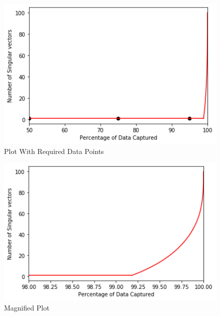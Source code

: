 \documentclass[a4 paper]{article}
\begin{document}
\begin{figure}[!htb]
    \centering
    \begin{minipage}{0.49\textwidth}
        \centering
        \includegraphics[width=1\textwidth]{Highly coorelated 1.png} \\
         Plot With Required Data Points
    \end{minipage}\hfill
    \begin{minipage}{0.49\textwidth}
        \centering
        \includegraphics[width=1\textwidth]{Highly coorelated 2.png}\\
          Magnified Plot
    \end{minipage}
    \label{fig:l}
\end{figure}
\end{document}
